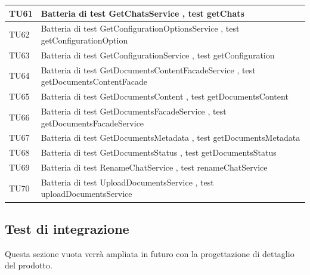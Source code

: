 \documentclass[10pt, a4paper]{article}
\begin{document}
\begin{xltabular}{\textwidth}{p{0.12\textwidth}|X}
\hline
TU61 & Batteria di test GetChatsService , test getChats \\
\hline
TU62 & Batteria di test GetConfigurationOptionsService , test getConfigurationOption \\
\hline
TU63 & Batteria di test GetConfigurationService , test getConfiguration \\
\hline
TU64 & Batteria di test GetDocumentsContentFacadeService , test getDocumentsContentFacade \\
\hline
TU65 & Batteria di test GetDocumentsContent , test getDocumentsContent \\
\hline
TU66 & Batteria di test GetDocumentsFacadeService , test getDocumentsFacadeService \\
\hline
TU67 & Batteria di test GetDocumentsMetadata , test getDocumentsMetadata \\
\hline
TU68 & Batteria di test GetDocumentsStatus , test getDocumentsStatus \\
\hline
TU69 & Batteria di test RenameChatService , test renameChatService \\
\hline
TU70 & Batteria di test UploadDocumentsService , test uploadDocumentsService \\
\hline


\end{xltabular}

\subsection{Test di integrazione}
Questa sezione vuota verrà ampliata in futuro con la progettazione di dettaglio del prodotto.

\end{document}
